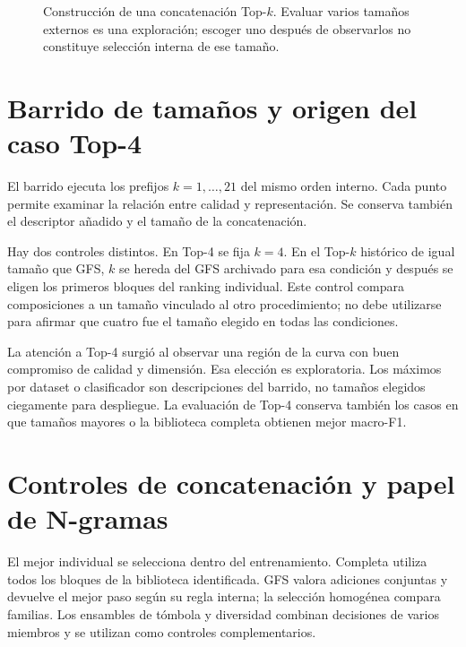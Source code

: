 \begin{figure}[!htbp]\centering
{}
\caption{Construcción de una concatenación Top-\(k\). Evaluar varios tamaños externos es una exploración; escoger uno después de observarlos no constituye selección interna de ese tamaño.}
\label{fig:tk-training}
\end{figure}

\section{Barrido de tamaños y origen del caso Top-4}
El barrido ejecuta los prefijos \(k=1,\ldots,21\) del mismo orden interno. Cada punto permite examinar la relación entre calidad y representación. Se conserva también el descriptor añadido y el tamaño de la concatenación.

Hay dos controles distintos. En Top-4 se fija \(k=4\). En el Top-\(k\) histórico de igual tamaño que GFS, \(k\) se hereda del GFS archivado para esa condición y después se eligen los primeros bloques del ranking individual. Este control compara composiciones a un tamaño vinculado al otro procedimiento; no debe utilizarse para afirmar que cuatro fue el tamaño elegido en todas las condiciones.

La atención a Top-4 surgió al observar una región de la curva con buen compromiso de calidad y dimensión. Esa elección es exploratoria. Los máximos por dataset o clasificador son descripciones del barrido, no tamaños elegidos ciegamente para despliegue. La evaluación de Top-4 conserva también los casos en que tamaños mayores o la biblioteca completa obtienen mejor macro-F1.

\section{Controles de concatenación y papel de N-gramas}
El mejor individual se selecciona dentro del entrenamiento. Completa utiliza todos los bloques de la biblioteca identificada. GFS valora adiciones conjuntas y devuelve el mejor paso según su regla interna; la selección homogénea compara familias. Los ensambles de tómbola y diversidad combinan decisiones de varios miembros y se utilizan como controles complementarios.

